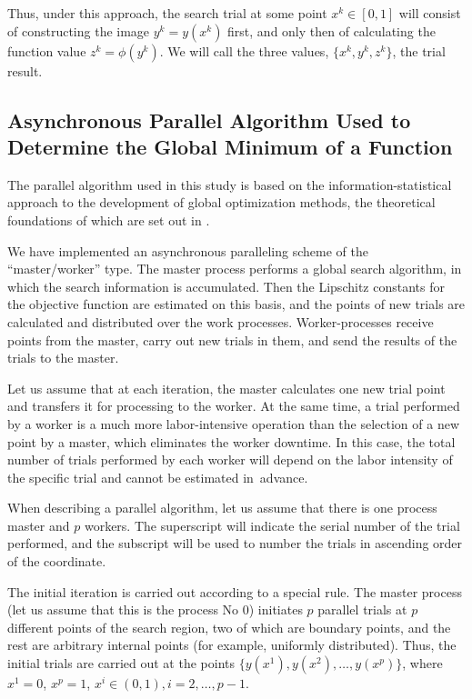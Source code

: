 \documentclass[mathematics,article,accept,pdftex,moreauthors]{Definitions/mdpi}
\begin{document}
	
	Thus, under this approach, the search trial at some point $x^k\in[0,1]$ will consist of constructing the image $y^k=y(x^k)$ first, and only then of calculating the function value $ z^k = \phi(y^k)$.
	We will call the three values, $\{x^k,y ^k,z^k\}$, the trial result.
	
	\subsection{Asynchronous Parallel Algorithm Used to Determine the Global Minimum of a Function}
	
	The parallel algorithm used in this study is based on the information-statistical approach to the development of global optimization methods, the theoretical foundations of which are set out in \cite{Strongin2000}. 
	
	We have implemented an asynchronous paralleling scheme of the ``master/worker'' type. The master process performs a global search algorithm, in which the search information is accumulated. Then the Lipschitz constants for the objective function are estimated on this basis, and the points of new trials are calculated and distributed over the work processes. Worker-processes receive points from the master, carry out new trials in them, and send the results of the trials to the master. 
	
	Let us assume that at each iteration, the master calculates one new trial  point and transfers it for processing to the worker. At the same time, a trial performed by a worker is a much more labor-intensive operation than the selection of a new point by a master, which eliminates the worker downtime. 
	In this case, the total number of trials performed by each worker  will depend on the labor intensity of the specific trial and cannot be estimated in~advance.
	
	When describing a parallel algorithm, let us assume that there is one process master and $p$ workers. The {superscript} will indicate the serial number of the trial performed, and the {subscript} will be used to number the trials in ascending order of the coordinate.
	
	The initial iteration is carried out according to a special rule. The master process (let us assume that this is the process No 0) initiates  $p$ parallel trials at $p$ different points of the search region, two of which are boundary points, and the rest are arbitrary internal points (for example, uniformly distributed). Thus, the initial trials are carried out at the points $\{y(x^1), y(x^2), \dots,y(x^p)\}$, where $x^1 = 0$, $x^p = 1$, $x^i\in(0,1), i=2,\dots, p-1$.
	
\end{document}
